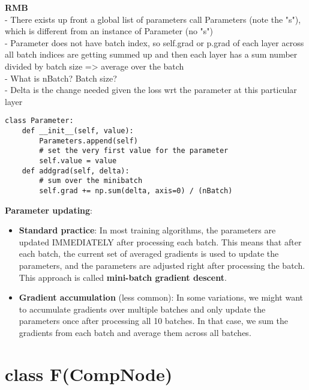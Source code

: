 \documentclass{article}
\begin{document}
\textbf{RMB}\\
- There exists up front a global list of parameters call Parameters (note the "s"), which is different from an instance of Parameter (no "s") \\
- Parameter does not have batch index, so self.grad or p.grad of each layer across all batch indices are getting summed up and then each layer has a sum number divided by batch size => average over the batch\\
- What is nBatch? Batch size?\\
- Delta is the change needed given the loss wrt the parameter at this particular layer
\begin{verbatim}
class Parameter:
    def __init__(self, value):
        Parameters.append(self)
        # set the very first value for the parameter
        self.value = value 
    def addgrad(self, delta):
        # sum over the minibatch
        self.grad += np.sum(delta, axis=0) / (nBatch)
\end{verbatim}
\textbf{Parameter updating}:
\begin{itemize}
    \item \textbf{Standard practice}: In most training algorithms, the parameters are updated IMMEDIATELY after processing each batch. This means that after each batch, the current set of averaged gradients is used to update the parameters, and the parameters are adjusted right after processing the batch. This approach is called \textbf{mini-batch gradient descent}.
    \item \textbf{Gradient accumulation} (less common): In some variations, we might want to accumulate gradients over multiple batches and only update the parameters once after processing all 10 batches. In that case, we sum the gradients from each batch and average them across all batches.
\end{itemize}
 

\section{class F(CompNode)}
\end{document}
